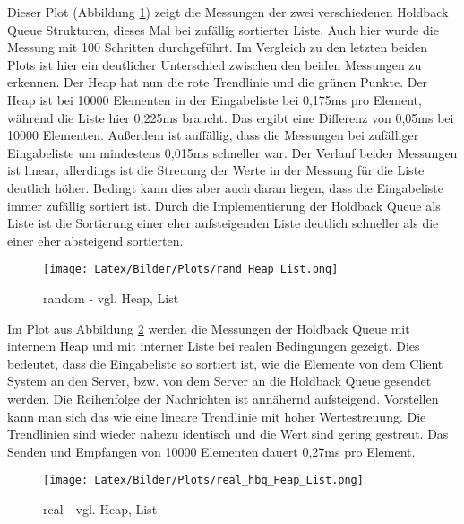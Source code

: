 Dieser Plot (Abbildung \ref{fig:rand_heapList}) zeigt die Messungen der zwei verschiedenen Holdback Queue Strukturen, dieses Mal bei zufällig sortierter Liste. Auch hier wurde die Messung mit 100 Schritten durchgeführt. Im Vergleich zu den letzten beiden Plots ist hier ein deutlicher Unterschied zwischen den beiden Messungen zu erkennen. Der Heap hat nun die rote Trendlinie und die grünen Punkte. Der Heap ist bei 10000 Elementen in der Eingabeliste bei 0,175ms pro Element, während die Liste hier 0,225ms braucht. Das ergibt eine Differenz von 0,05ms bei 10000 Elementen. Außerdem ist auffällig, dass die Messungen bei zufälliger Eingabeliste um mindestens 0,015ms schneller war. Der Verlauf beider Messungen ist linear, allerdings ist die Streuung der Werte in der Messung für die Liste deutlich höher. Bedingt kann dies aber auch daran liegen, dass die Eingabeliste immer zufällig sortiert ist. Durch die Implementierung der Holdback Queue als Liste ist die Sortierung einer eher aufsteigenden Liste deutlich schneller als die einer eher absteigend sortierten. 

\begin{figure}[htbp]
\begin{center}
\texttt{[image: Latex/Bilder/Plots/rand\_Heap\_List.png]}
\caption{\label{fig:rand_heapList} random - vgl. Heap, List} 
\end{center}
\end{figure}

Im Plot aus Abbildung \ref{fig:real_heapList} werden die Messungen der Holdback Queue mit internem Heap und mit interner Liste bei realen Bedingungen gezeigt. Dies bedeutet, dass die Eingabeliste so sortiert ist, wie die Elemente von dem Client System an den Server, bzw. von dem Server an die Holdback Queue gesendet werden. Die Reihenfolge der Nachrichten ist annähernd aufsteigend. Vorstellen kann man sich das wie eine lineare Trendlinie mit hoher Wertestreuung. Die Trendlinien sind wieder nahezu identisch und die Wert sind gering gestreut. Das Senden und Empfangen von 10000 Elementen dauert 0,27ms pro Element.

\begin{figure}[htbp]
\begin{center}
\texttt{[image: Latex/Bilder/Plots/real\_hbq\_Heap\_List.png]}
\caption{\label{fig:real_heapList} real - vgl. Heap, List} 
\end{center}
\end{figure}

